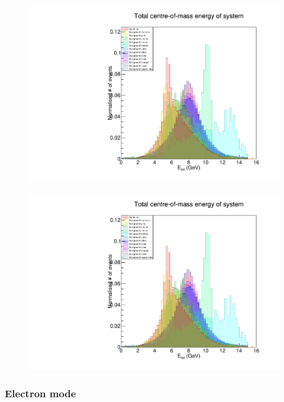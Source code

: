 \documentclass[12pt,a4paper]{article} %
\begin{document}
\begin{figure}[h]
\centering
\begin{minipage}{.5\textwidth}
  \centering
  \includegraphics[width=\linewidth]{images/stack/stack_cut6_totalCM_E.pdf}
  \label{fig:test1}
\end{minipage}%
\begin{minipage}{.5\textwidth}
  \centering
  \includegraphics[width=\linewidth]{images/stack/stack_cut6_totalCM_E.pdf}
  \label{fig:test2}
\end{minipage}
\end{figure}

\subsubsection{Electron mode}
\end{document}

